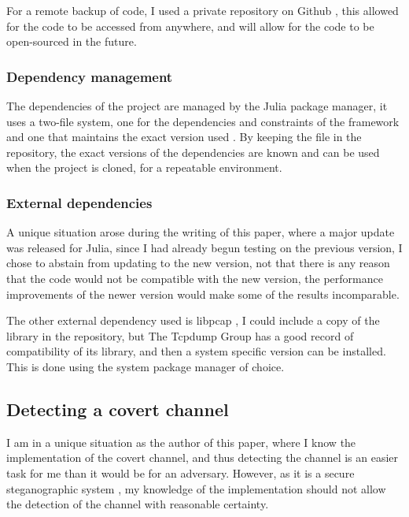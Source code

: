 For a remote backup of code, I used a private repository on Github \cite{github}, this allowed for the code to be accessed from anywhere, and will allow for the code to be open-sourced in the future.

\subsubsection{Dependency management}

The dependencies of the project are managed by the Julia package manager, it uses a two-file system, one for the dependencies and constraints of the framework  and one that maintains the exact version used . By keeping the  file in the repository, the exact versions of the dependencies are known and can be used when the project is cloned, for a repeatable environment.

\subsubsection{External dependencies}

A unique situation arose during the writing of this paper, where a major update was released for Julia, since I had already begun testing on the previous version, I chose to abstain from updating to the new version, not that there is any reason that the code would not be compatible with the new version, the performance improvements of the newer version would make some of the results incomparable.

The other external dependency used is libpcap \cite{libpcap}, I could include a copy of the library in the repository, but The Tcpdump Group has a good record of compatibility of its library, and then a system specific version can be installed. This is done using the system package manager of choice. 

\subsection{Detecting a covert channel}

I am in a unique situation as the author of this paper, where I know the implementation of the covert channel, and thus detecting the channel is an easier task for me than it would be for an adversary. However, as it is a secure steganographic system \cite{SaW}, my knowledge of the implementation should not allow the detection of the channel with reasonable certainty.


